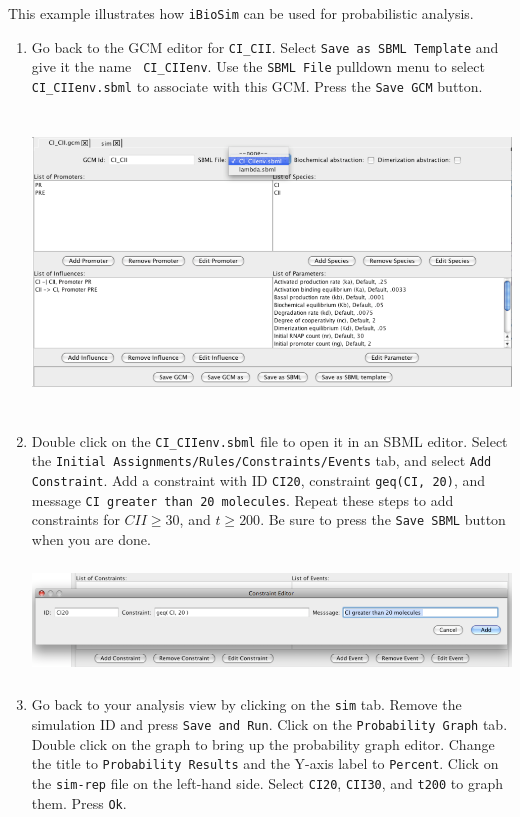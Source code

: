 \documentclass[titlepage,11pt]{article}
\begin{document}
This example illustrates how {\tt iBioSim} can be used for
probabilistic analysis.
\begin{enumerate}
\item Go back to the GCM editor for {\tt CI\_CII}.  
Select {\tt Save as SBML Template} and give it the name {\tt
  CI\_CIIenv}.  Use the {\tt SBML File} pulldown menu to select
{\tt CI\_CIIenv.sbml} to associate with this GCM.  Press the
{\tt Save GCM} button.

\includegraphics[height=80mm]{screenshots/linkSBML}

\item Double click on the {\tt CI\_CIIenv.sbml} file to open it in an
  SBML editor.  Select the {\tt Initial
    Assignments/Rules/Constraints/Events} tab, and select {\tt Add
    Constraint}.  Add a constraint with ID {\tt CI20}, constraint
{\tt geq(CI, 20)}, and message {\tt CI greater than 20 molecules}.
Repeat these steps to add constraints for $CII \geq 30$, and $t \geq
200$. Be sure to press the {\tt Save SBML} button when you are done.

\includegraphics[height=30mm]{screenshots/constraint}

\clearpage

\item Go back to your analysis view by clicking on the {\tt sim} tab.
Remove the simulation ID and press {\tt Save and Run}.  Click on the 
{\tt Probability Graph} tab.
Double click on the graph to bring up the probability graph
  editor.  Change the title to {\tt Probability Results} and the 
Y-axis label to {\tt Percent}.  Click on the {\tt sim-rep} file on the 
left-hand side.  Select {\tt CI20}, {\tt CII30}, and {\tt t200} to
graph them.  Press {\tt Ok}.


\end{enumerate}
\end{document}
